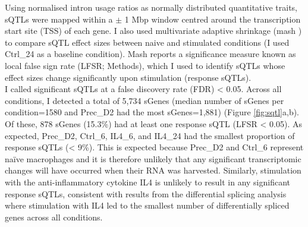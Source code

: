 Using normalised intron usage ratios as normally distributed quantitative traits, sQTLs were mapped within a $\pm$ 1 Mbp window centred around the transcription start site (TSS) of each gene. I also used multivariate adaptive shrinkage (mash \cite{Urbut2019-gf}) to compare sQTL effect sizes between naive and stimulated conditions (I used Ctrl\_24 as a baseline condition). Mash reports a significance measure known as local false sign rate (LFSR; Methods), which I used to identify sQTLs whose effect sizes change significantly upon stimulation (response sQTLs). \\

I called significant sQTLs at a false discovery rate (FDR) < 0.05. Across all conditions, I detected a total of 5,734 sGenes (median number of sGenes per condition=1580 and Prec\_D2 had the most sGenes=1,881) (Figure \ref{fig:sqtl}a,b). Of these, 878 sGenes (15.3\%) had at least one response sQTL (LFSR < 0.05).  As expected, Prec\_D2, Ctrl\_6, IL4\_6, and IL4\_24 had the smallest proportion of response sQTLs (< 9\%). This is expected because Prec\_D2 and Ctrl\_6 represent naïve macrophages and it is therefore unlikely that any significant transcriptomic changes will have occurred when their RNA was harvested. Similarly, stimulation with the anti-inflammatory cytokine IL4 is unlikely to result in any significant response sQTLs, consistent with results from the differential splicing analysis where stimulation with IL4 led to the smallest number of differentially spliced genes across all conditions.\\

